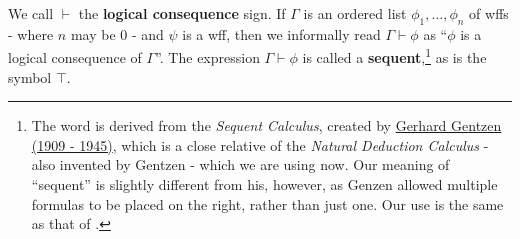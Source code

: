 \begin{defn}
\label{Defn: Sequents}
We call $\vdash$ the \textbf{logical consequence} sign. If $\Gamma$ is an ordered list $\phi_1, \dots, \phi_n$ of wffs - where $n$ may be $0$ - and $\psi$ is a wff, then we informally read $\Gamma\vdash \phi$ as \enquote{$\phi$ is a logical consequence of $\Gamma$}. The expression $\Gamma\vdash\phi$ is called a \textbf{sequent},\footnote{The word is derived from the \emph{Sequent Calculus}, created by \hyperref[GGentzen]{Gerhard Gentzen (1909 - 1945)}, which is a close relative of the \emph{Natural Deduction Calculus} - also invented by Gentzen - which we are using now. Our meaning of \enquote{sequent} is slightly different from his, however, as Genzen allowed multiple formulas to be placed on the right, rather than just one. Our use is the same as that of \cite{HuthRyan2004}.} as is the symbol $\top$.
\end{defn}

